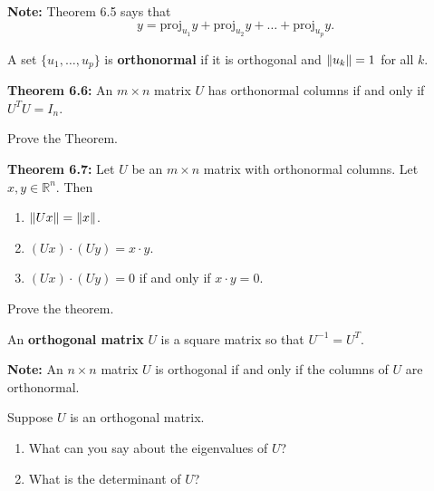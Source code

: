 \begin{enumerate}
\vfill

{\bf Note:} Theorem 6.5 says that $$y=\text{proj}_{u_1}{y}+\text{proj}_{u_2}{y}+\dots+ \text{proj}_{u_p}{y}.$$

\begin{defn} A set $\{u_1, \dots, u_p\}$ is {\bf orthonormal} if it is orthogonal and $\left\lVert u_k\right\rVert=1$ for all $k$.
\end{defn}

{\bf Theorem 6.6:} An $m\times n$ matrix $U$ has orthonormal columns if and only if $U^{T}U=I_n$.

\Problem Prove the Theorem.

\vfill

\newpage

{\bf Theorem 6.7:} Let $U$ be an $m\times n$ matrix with orthonormal columns. Let $x,y \in \mathbb{R}^n$. Then
\begin{enumerate}
\item $\left\lVert Ux\right\rVert=\left\lVert x\right\rVert$.
\item $(Ux)\cdot (Uy) = x \cdot y$.
\item $(Ux) \cdot (Uy)=0$ if and only if $x \cdot y=0$.
\end{enumerate}
\Problem Prove the theorem.

\vfill

\begin{defn} An {\bf orthogonal matrix} $U$ is a square matrix so that $U^{-1}=U^{T}$. 
\end{defn}

{\bf Note:} An $n \times n$ matrix $U$ is orthogonal if and only if the columns of $U$ are orthonormal.

\Problem Suppose $U$ is an orthogonal matrix.
\begin{enumerate}
\item  What can you say about the eigenvalues of $U$?

\vfill

\item What is the determinant of $U$?

\vfill

\end{enumerate}

\newpage



\end{enumerate}

